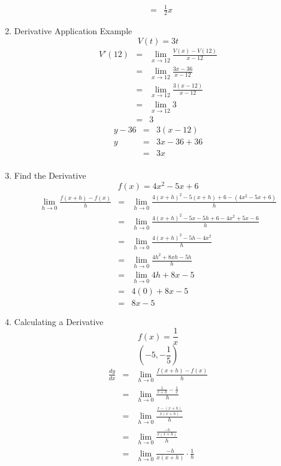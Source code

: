 \documentclass{article}
\begin{document}
\begin{enumerate}
\begin{eqnarray}
        &=& \frac{1}{2}x
    \end{eqnarray}
    \item Derivative Application Example
    $$V(t) = 3t$$
    \begin{eqnarray}
        V'(12) &=& \lim_{x \to 12}{\frac{V(x) - V(12)}{x - 12}} \\
               &=& \lim_{x \to 12}{\frac{3x - 36}{x - 12}} \\
               &=& \lim_{x \to 12}{\frac{3(x - 12)}{x - 12}} \\
               &=& \lim_{x \to 12}{3} \\
               &=& 3
    \end{eqnarray}
    \begin{eqnarray}
        y - 36 &=& 3(x - 12) \\
        y &=& 3x - 36 + 36 \\
          &=& 3x \\
    \end{eqnarray}
    \item Find the Derivative
    $$f(x) = 4x^2 - 5x + 6$$
    \begin{eqnarray}
        \lim_{h \to 0}{\frac{f(x + h) - f(x)}{h}} &=& \lim_{h \to 0}{\frac{4(x + h)^2 - 5(x + h) + 6 - (4x^2 - 5x + 6)}{h}} \\
        &=& \lim_{h \to 0}{\frac{4(x + h)^2 - 5x - 5h + 6 - 4x^2 + 5x - 6}{h}} \\
        &=& \lim_{h \to 0}{\frac{4(x + h)^2 - 5h - 4x^2}{h}} \\
        &=& \lim_{h \to 0}{\frac{4h^2 + 8xh - 5h}{h}} \\
        &=& \lim_{h \to 0}{4h + 8x - 5} \\
        &=& 4(0) + 8x - 5 \\
        &=& 8x - 5
    \end{eqnarray}
    \item Calculating a Derivative
    $$f(x) = \frac{1}{x}$$
    $$(-5, - \frac{1}{5})$$
    \begin{eqnarray}
        \frac{dy}{dx} &=& \lim_{h \to 0}{\frac{f(x + h) - f(x)}{h}} \\
                      &=& \lim_{h \to 0}{\frac{\frac{1}{x + h} - \frac{1}{x}}{h}} \\
                      &=& \lim_{h \to 0}{\frac{\frac{x - (x + h)}{x(x + h)}}{h}} \\
                      &=& \lim_{h \to 0}{\frac{\frac{-h}{x(x + h)}}{h}} \\
                      &=& \lim_{h \to 0}{\frac{-h}{x(x + h)} \cdot \frac{1}{h}} \\

\end{eqnarray}
\end{enumerate}
\end{document}

